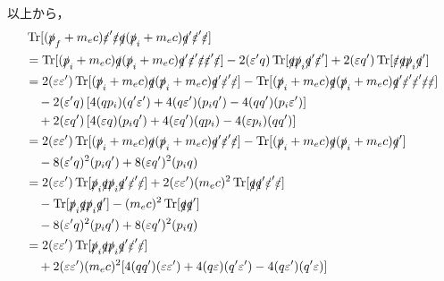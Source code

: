 以上から，
\begin{align*}
  & \Tr [(\slashed{p}_f+m_ec)\slashed{\varepsilon}'\slashed{\varepsilon}\slashed{q}(\slashed{p}_i+m_ec)\slashed{q}'\slashed{\varepsilon}'\slashed{\varepsilon}]\\
  & = \Tr [(\slashed{p}_i+m_ec)\slashed{q}(\slashed{p}_i+m_ec)\slashed{q}'\slashed{\varepsilon}'\slashed{\varepsilon}\slashed{\varepsilon}'\slashed{\varepsilon}] - 2(\varepsilon'q)\Tr [\slashed{q}\slashed{p}_i\slashed{q}'\slashed{\varepsilon}'] + 2(\varepsilon q')\Tr [\slashed{\varepsilon}\slashed{q}\slashed{p}_i\slashed{q}']\\
  & = 2(\varepsilon\varepsilon')\Tr [(\slashed{p}_i+m_ec)\slashed{q}(\slashed{p}_i+m_ec)\slashed{q}'\slashed{\varepsilon}'\slashed{\varepsilon}] - \Tr [(\slashed{p}_i+m_ec)\slashed{q}(\slashed{p}_i+m_ec)\slashed{q}'\slashed{\varepsilon}'\slashed{\varepsilon}'\slashed{\varepsilon}\slashed{\varepsilon}]\\
  & \quad -2(\varepsilon'q)\left[4(qp_i)(q'\varepsilon')+4(q\varepsilon')(p_iq')-4(qq')(p_i\varepsilon')\right]\\
  & \quad +2(\varepsilon q')\left[4(\varepsilon q)(p_iq')+4(\varepsilon q')(qp_i)-4(\varepsilon p_i)(qq')\right]\\
  & = 2(\varepsilon\varepsilon')\Tr [(\slashed{p}_i+m_ec)\slashed{q}(\slashed{p}_i+m_ec)\slashed{q}'\slashed{\varepsilon}'\slashed{\varepsilon}] - \Tr [(\slashed{p}_i+m_ec)\slashed{q}(\slashed{p}_i+m_ec)\slashed{q}']\\
  & \quad -8(\varepsilon'q)^2(p_iq') + 8(\varepsilon q')^2(p_iq)\\
  & = 2(\varepsilon\varepsilon')\Tr [\slashed{p}_i\slashed{q}\slashed{p}_i\slashed{q}'\slashed{\varepsilon}'\slashed{\varepsilon}] + 2(\varepsilon\varepsilon')(m_ec)^2\Tr [\slashed{q}\slashed{q}'\slashed{\varepsilon}'\slashed{\varepsilon}]\\
  & \quad -\Tr [\slashed{p}_i\slashed{q}\slashed{p}_i\slashed{q}'] - (m_ec)^2\Tr [\slashed{q}\slashed{q}']\\
  & \quad -8(\varepsilon'q)^2(p_iq') + 8(\varepsilon q')^2(p_iq)\\
  & = 2(\varepsilon\varepsilon')\Tr [\slashed{p}_i\slashed{q}\slashed{p}_i\slashed{q}'\slashed{\varepsilon}'\slashed{\varepsilon}]\\
  & \quad + 2(\varepsilon\varepsilon')(m_ec)^2[4(qq')(\varepsilon\varepsilon')+4(q\varepsilon)(q'\varepsilon')-4(q\varepsilon')(q'\varepsilon)]\\

\end{align*}
